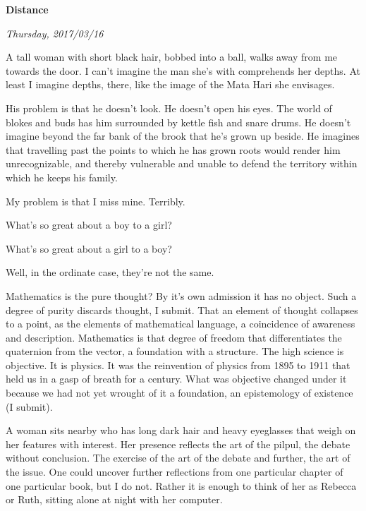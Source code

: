 

\centerline{\bf Distance}
\centerline{\it Thursday, 2017/03/16}



\break


A tall woman with short black hair, bobbed into a ball, walks away
from me towards the door.  I can't imagine the man she's with
comprehends her depths.  At least I imagine depths, there, like the
image of the Mata Hari she envisages.

His problem is that he doesn't look.  He doesn't open his eyes.  The
world of blokes and buds has him surrounded by kettle fish and snare
drums.  He doesn't imagine beyond the far bank of the brook that he's
grown up beside.  He imagines that travelling past the points to which
he has grown roots would render him unrecognizable, and thereby
vulnerable and unable to defend the territory within which he keeps
his family.

My problem is that I miss mine.  Terribly.


\break

What's so great about a boy to a girl?

What's so great about a girl to a boy?

Well, in the ordinate case, they're not the same.



\break


Mathematics is the pure thought?  By it's own admission it has no
object.  Such a degree of purity discards thought, I submit.  That an
element of thought collapses to a point, as the elements of
mathematical language, a coincidence of awareness and description.
Mathematics is that degree of freedom that differentiates the
quaternion from the vector, a foundation with a structure.  The high
science is objective.  It is physics.  It was the reinvention of
physics from 1895 to 1911 that held us in a gasp of breath for a
century.  What was objective changed under it because we had not yet
wrought of it a foundation, an epistemology of existence (I submit).


\break

A woman sits nearby who has long dark hair and heavy eyeglasses that
weigh on her features with interest.  Her presence reflects the art of
the pilpul, the debate without conclusion.  The exercise of the art of
the debate and further, the art of the issue.  One could uncover
further reflections from one particular chapter of one particular
book, but I do not.  Rather it is enough to think of her as Rebecca or
Ruth, sitting alone at night with her computer.


